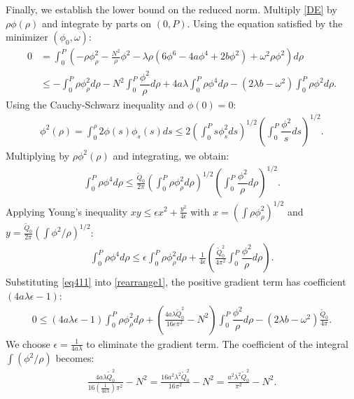 \documentclass[12pt]{article}
\begin{document}
	Finally, we establish the lower bound on the reduced norm. Multiply \eqref{DE} by $\rho\phi(\rho)$ and integrate by parts on $(0,P)$. Using the equation satisfied by the minimizer $(\phi_0, \omega)$:
	\begin{align}
		0 &= \int_0^{P} \left( -\rho \phi_{\rho}^2 - \frac{N^2}{\rho}\phi^2 - \lambda\rho(6\phi^6 - 4a\phi^4 + 2b\phi^2) + \omega^2\rho\phi^2 \right) d\rho \nonumber \\
		&\leq -\int_0^{P} \rho \phi_{\rho}^2 d\rho - N^2\int_0^P\dfrac{\phi^2}{\rho}d\rho + 4a\lambda\int_0^P\rho\phi^4d\rho - (2\lambda b-\omega^2)\int_0^P\rho\phi^2d\rho.\label{rearrange1}
	\end{align}
	Using the Cauchy-Schwarz inequality and $\phi(0)=0$:
	\begin{align}
		\phi^2(\rho) = \int_0^{\rho} 2\phi(s)\phi_{s}(s)ds \leq 2\left(\int_0^P s\phi_{s}^2 ds\right)^{1/2}\left(\int_0^P \dfrac{\phi^2}{s} ds\right)^{1/2}.
	\end{align}
	Multiplying by $\rho \phi^2(\rho)$ and integrating, we obtain:
	\begin{align}
		\int_0^{P} \rho\phi^4 d\rho \leq \frac{\tilde{Q}_0}{2\pi} \left(\int_0^{P}\rho \phi_{\rho}^2 d\rho\right)^{1/2}\left(\int_0^{P}\dfrac{\phi^2}{\rho}d\rho\right)^{1/2}.
	\end{align}
	Applying Young's inequality $xy \leq \epsilon x^2 + \frac{y^2}{4\epsilon}$ with $x = (\int \rho \phi_\rho^2)^{1/2}$ and $y = \frac{\tilde{Q}_0}{2\pi} (\int \phi^2/\rho)^{1/2}$:
	\begin{align}
		\int_0^{P} \rho\phi^4 d\rho \leq \epsilon \int_0^{P}\rho \phi_{\rho}^2 d\rho + \frac{1}{4\epsilon} \left(\frac{\tilde{Q}_0^2}{4\pi^2}\int_0^{P}\dfrac{\phi^2}{\rho}d\rho\right).\label{eq411}
	\end{align}
	Substituting \eqref{eq411} into \eqref{rearrange1}, the positive gradient term has coefficient $(4a\lambda\epsilon - 1)$:
	\begin{align}
		0 \leq (4a\lambda\epsilon-1)\int_0^{P}\rho \phi^2_{\rho}d\rho + \left(\frac{4a\lambda \tilde{Q}_0^2}{16\epsilon \pi^2} - N^2\right)\int_0^{P}\dfrac{\phi^2}{\rho}d\rho - (2\lambda b-\omega^2) \frac{\tilde{Q}_0}{4\pi}.
	\end{align}
	We choose $\epsilon = \frac{1}{4a\lambda}$ to eliminate the gradient term. The coefficient of the integral $\int (\phi^2/\rho)$ becomes:
	\begin{align}
		\frac{4a\lambda \tilde{Q}_0^2}{16 \left(\frac{1}{4a\lambda}\right) \pi^2} - N^2 = \frac{16 a^2 \lambda^2 \tilde{Q}_0^2}{16 \pi^2} - N^2 = \frac{a^2 \lambda^2 \tilde{Q}_0^2}{\pi^2} - N^2.
	\end{align}
\end{document}
